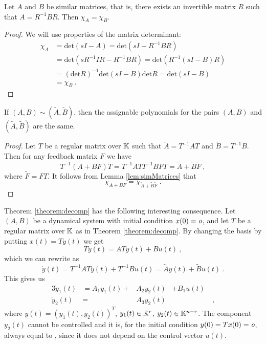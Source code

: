 \begin{lemma}
	\label{lem:simMatrices}
	Let $A$ and $B$ be similar matrices, that is, there exists an invertible matrix $R$ such that $A=R^{-1}BR$. Then $\chi_A=\chi_B$.
\end{lemma}

\begin{proof}
	We will use properties of the matrix determinant:
	\begin{align*}
		\chi_A&=\text{det}(sI-A)=\text{det}(sI-R^{-1}BR) \\
		&=\text{det}(sR^{-1}IR-R^{-1}BR)=\text{det}(R^{-1}(sI-B)R) \\
		&=(\text{det}R)^{-1}\text{det}(sI-B)\text{det}R=\text{det}(sI-B) \\
		&=\chi_B\ .
	\end{align*}
\end{proof}

\begin{lemma}
	\label{lem:simPairsAssignablePolynomial}
	If $(A,B)\sim(\widetilde{A},\widetilde{B})$, then the assignable polynomials for the pairs $(A,B)$ and $(\widetilde{A},\widetilde{B})$ are the same.
\end{lemma}

\begin{proof}
	Let $T$ be a regular matrix over $\mathbb{K}$ such that $\widetilde{A}=T^{-1}AT$ and $\widetilde{B}=T^{-1}B$. Then for any feedback matrix $F$ we have 
	$$T^{-1}(A+BF)T=T^{-1}ATT^{-1}BFT=\widetilde{A}+\widetilde{B}\widetilde{F}\ ,$$
	where $\widetilde{F}=FT$. It follows from Lemma \ref{lem:simMatrices} that $$\chi_{A+BF}=\chi_{\widetilde{A}+\widetilde{B}\widetilde{F}}\ .$$
\end{proof}

Theorem \ref{theorem:decomp} has the following interesting consequence. Let $(A,B)$ be a dynamical system with initial condition $x(0)=\textit{o}$, and let $T$ be a regular matrix over $\mathbb{K}$ as in Theorem \ref{theorem:decomp}. By changing the basis by putting $x(t)=Ty(t)$ we get 
$$T\dot{y}(t)=ATy(t)+Bu(t)\ ,$$ 
which we can rewrite as 
$$\dot{y}(t)=T^{-1}ATy(t)+T^{-1}Bu(t)=\widetilde{A}y(t)+\widetilde{B}u(t)\ .$$ 
This gives us 
\begin{alignat*}{3}
	\dot{y}_1(t)&=A_1y_1(t)+&A_2y_2(t)&+B_1u(t)& \\
	\dot{y}_2(t)&=&A_3y_2(t)&&\ ,
\end{alignat*}
where $y(t)=(y_1(t),y_2(t))^T$, $y_1(t)\in\mathbb{K}^r$, $y_2(t)\in\mathbb{K}^{n-r}$. The component $y_2(t)$ cannot be controlled and it is, for the initial condition $y(0)=Tx(0)=\textit{o}$, always equal to \nullvector, since it does not depend on the control vector $u(t)$. 

